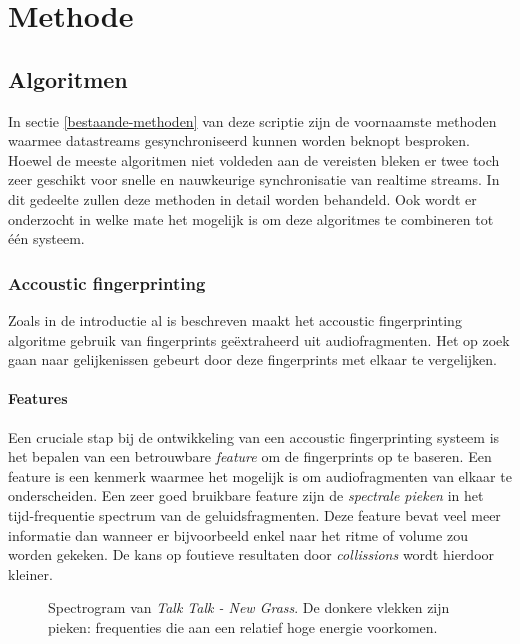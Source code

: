 \chapter{Methode}

\section{Algoritmen}

In sectie \ref{bestaande-methoden} van deze scriptie zijn de voornaamste methoden waarmee datastreams gesynchroniseerd kunnen worden beknopt besproken. Hoewel de meeste algoritmen niet voldeden aan de vereisten bleken er twee toch zeer geschikt voor snelle en nauwkeurige synchronisatie van realtime streams. In dit gedeelte zullen deze methoden in detail worden behandeld. Ook wordt er onderzocht in welke mate het mogelijk is om deze algoritmes te combineren tot één systeem.

\subsection{Accoustic fingerprinting}
\label{accoustic-fingerprinting}

Zoals in de introductie al is beschreven maakt het accoustic fingerprinting algoritme gebruik van fingerprints geëxtraheerd uit audiofragmenten. Het op zoek gaan naar gelijkenissen gebeurt door deze fingerprints met elkaar te vergelijken. 

\subsubsection{Features}

Een cruciale stap bij de ontwikkeling van een accoustic fingerprinting systeem is het bepalen van een betrouwbare \textit{feature} om de fingerprints op te baseren. Een feature is een kenmerk waarmee het mogelijk is om audiofragmenten van elkaar te onderscheiden. Een zeer goed bruikbare feature zijn de \textit{spectrale pieken} in het tijd-frequentie spectrum van de geluidsfragmenten. Deze feature bevat veel meer informatie dan wanneer er bijvoorbeeld enkel naar het ritme of volume zou worden gekeken. De kans op foutieve resultaten door \textit{collissions} wordt hierdoor kleiner.

\begin{figure}[h!]
	\captionsetup{width=0.7\textwidth}
	\caption[Voorbeeld van een spectrogram]{Spectrogram van \textit{Talk Talk - New Grass}. De donkere vlekken zijn pieken: frequenties die aan een relatief hoge energie voorkomen.}
	\begin{center}
		\advance\parskip0.3cm
		
	\end{center}
\end{figure}

